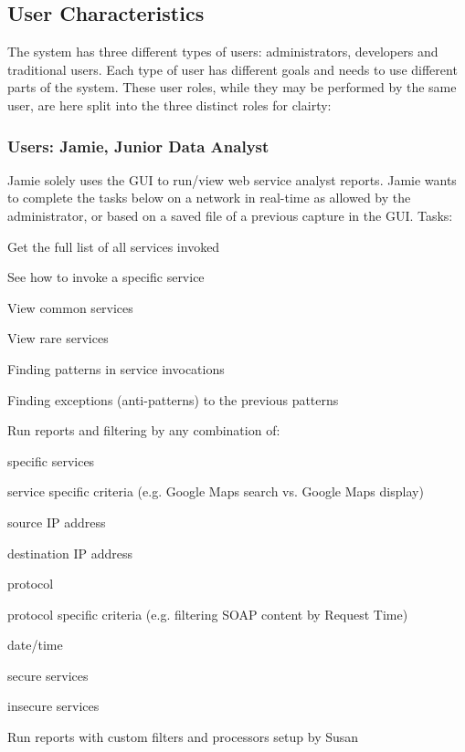 \documentclass[titlepage]{article}
\begin{document}
\subsection{User Characteristics%
  \label{user-characteristics}%
}

The system has three different types of users:  administrators, developers and
traditional users.  Each type of user has different goals and needs to use
different parts of the system.  These user roles, while they may be performed
by the same user, are here split into the three distinct roles for clairty:


\subsubsection{Users: Jamie, Junior Data Analyst%
  \label{jamie}%
}

Jamie solely uses the GUI to run/view web service analyst reports.  Jamie wants
to complete the tasks below on a network in real-time as allowed by the
administrator, or based on a saved file of a previous capture in the GUI.
%
Tasks:
\begin{itemize*}
    \item Get the full list of all services invoked
    \item See how to invoke a specific service
    \item View common services
    \item View rare services
    \item Finding patterns in service invocations
    \item Finding exceptions (anti-patterns) to the previous patterns
    \item Run reports and filtering by any combination of:
    \begin{itemize*}
        \item specific services
        \item service specific criteria (e.g. Google Maps search vs. Google Maps display)
        \item source IP address
        \item destination IP address
        \item protocol
        \item protocol specific criteria (e.g. filtering SOAP content by Request Time)
        \item date/time
        \item secure services
        \item insecure services
    \end{itemize*}
    \item Run reports with custom filters and processors setup by Susan
\end{itemize*}
\end{document}
